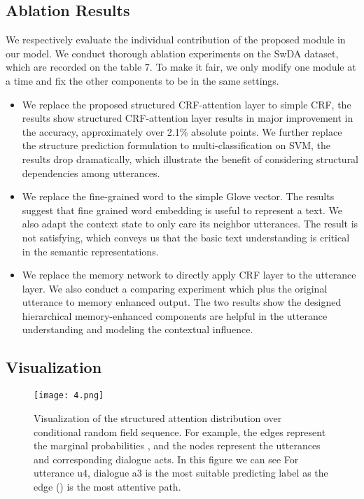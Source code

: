 \documentclass[sigconf]{acmart}
\begin{document}
\subsection{Ablation Results}
We respectively evaluate the individual contribution of the proposed module in our model. We conduct thorough ablation experiments on the SwDA dataset, which are recorded on the table 7. To make it fair, we only modify one module at a time and fix the other components to be in the same settings.

\begin{itemize}
	\item We replace the proposed structured CRF-attention layer to simple CRF, the results show structured CRF-attention layer results in major improvement in the accuracy, approximately over 2.1\% absolute points. We further replace the structure prediction formulation to multi-classification on SVM, the results drop dramatically, which illustrate the benefit of considering structural dependencies among utterances.
	\item We replace the fine-grained word  to the simple Glove vector. The results suggest that fine grained word embedding is useful to represent a text. We also adapt the context state  to only care its neighbor utterances. The result is not satisfying, which conveys us that the basic text understanding is critical in the semantic representations.
	\item We replace the memory network to directly apply CRF layer to the utterance layer. We also conduct a comparing experiment which plus the original utterance to memory enhanced output. The two results show the designed hierarchical memory-enhanced components are helpful in the utterance understanding and modeling the contextual influence. 
\end{itemize}

\subsection{Visualization}
\begin{figure}[t]
	\centering
	\texttt{[image: 4.png]}
	\caption{Visualization of the structured attention distribution over conditional random field sequence. For example, the edges represent the marginal probabilities , and the nodes represent the utterances and corresponding dialogue acts. In this figure we can see For utterance u4, dialogue a3 is the most suitable predicting label as the edge () is the most attentive path.}
\end{figure}
\end{document}
